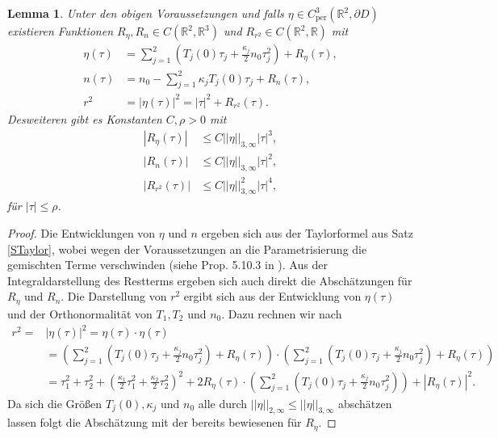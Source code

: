 \documentclass[12pt,a4paper]{scrartcl}
\newtheorem{Lemma}[Satz]{Lemma}
\numberwithin{equation}{section}
\newcommand{\R}{\mathbb{R}} %
\newcommand{\per}{\operatorname{per}}
\begin{document}
\begin{Lemma} \label{Leta}
Unter den obigen Voraussetzungen und falls $\eta \in C_{\per}^3(\R^2,\partial D)$ existieren Funktionen $R_\eta, R_n \in C(\R^2,\R^3)$ und $R_{r^2} \in C(\R^2,\R)$ mit
\begin{align*}
\eta(\tau) &= \sum_{j=1}^2\left(T_j(0) \tau_j + \frac{\kappa_j}{2} n_0 \tau_j^2 \right) + R_{\eta}(\tau),\\
n(\tau) &= n_0 - \sum_{j=1}^2 \kappa_j T_j (0) \tau_j +R_n(\tau), \\
r^2 &=|\eta(\tau)|^2 = |\tau|^2 + R_{r^2}(\tau).
\end{align*} 
Desweiteren gibt es Konstanten $C,\rho>0$ mit 
\begin{align*}
|R_{\eta}(\tau)| &\leq C ||\eta||_{3,\infty} |\tau|^3, \\
|R_n(\tau)| &\leq C ||\eta||_{3,\infty} |\tau|^2, \\
|R_{r^2}(\tau)| &\leq C ||\eta||_{3,\infty}^2 |\tau|^4,
\end{align*}
für $|\tau| \leq \rho$.
\end{Lemma}
\begin{proof}
Die Entwicklungen von $\eta$ und $n$ ergeben sich aus der Taylorformel aus Satz \ref{STaylor}, wobei wegen der Voraussetzungen an die Parametrisierung die gemischten Terme verschwinden (siehe Prop. 5.10.3 in \cite{Borceux}). 
Aus der Integraldarstellung des Restterms ergeben sich auch direkt die Abschätzungen für $R_\eta$ und $R_n$.
Die Darstellung von $r^2$ ergibt sich aus der Entwicklung von $\eta(\tau)$ und der Orthonormalität von $T_1, T_2$ und $n_0$. Dazu rechnen wir nach
\begin{align*}
r^2 =&|\eta(\tau)|^2 = \eta(\tau) \cdot \eta(\tau) \\
&=\left(\sum_{j=1}^2\left(T_j(0) \tau_j + \frac{\kappa_j}{2} n_0 \tau_j^2 \right) + R_{\eta}(\tau)\right) \cdot \left( \sum_{j=1}^2\left(T_j(0) \tau_j + \frac{\kappa_j}{2} n_0 \tau_j^2 \right) + R_{\eta}(\tau) \right) \\
&=\tau_1^2 + \tau_2^2 + \left( \frac{\kappa_1}{2}\tau_1^2 +\frac{\kappa_2}{2} \tau_2^2\right)^2 + 2 R_{\eta}(\tau) \cdot \left( \sum_{j=1}^2 \left(T_j(0)\tau_j+\frac{\kappa_j}{2}n_0 \tau_j^2 \right) \right) + |R_{\eta}(\tau)|^2.
\end{align*}
Da sich die Größen $T_j(0), \kappa_j$ und $n_0$ alle durch $||\eta||_{2,\infty}\leq ||\eta||_{3,\infty}$ abschätzen lassen folgt die Abschätzung mit der bereits bewiesenen für $R_\eta$.
\end{proof}
\end{document}
